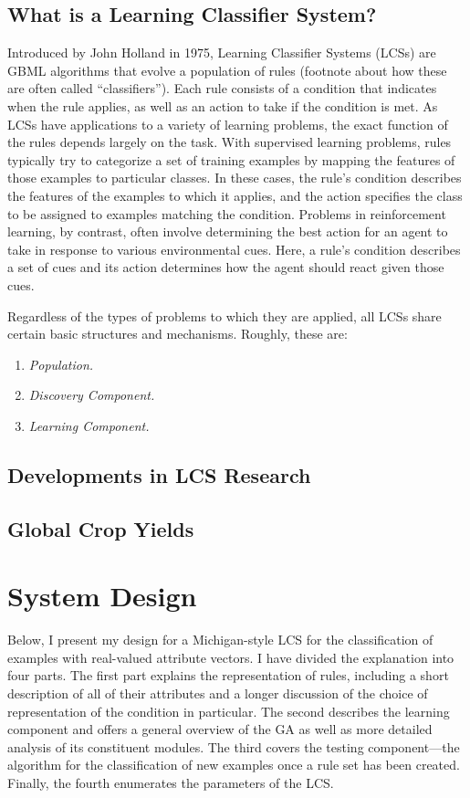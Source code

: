\documentclass[11pt]{article}
\begin{document}
\subsection{What is a Learning Classifier System?}

Introduced by John Holland in 1975, Learning Classifier Systems (LCSs) are GBML algorithms that evolve a population of rules (footnote about how these are often called “classifiers”). Each rule consists of a condition that indicates when the rule applies, as well as an action to take if the condition is met. As LCSs have applications to a variety of learning problems, the exact function of the rules depends largely on the task. With supervised learning problems, rules typically try to categorize a set of training examples by mapping the features of those examples to particular classes. In these cases, the rule’s condition describes the features of the examples to which it applies, and the action specifies the class to be assigned to examples matching the condition. Problems in reinforcement learning, by contrast, often involve determining the best action for an agent to take in response to various environmental cues. Here, a rule’s condition describes a set of cues and its action determines how the agent should react given those cues.

Regardless of the types of problems to which they are applied, all LCSs share certain basic structures and mechanisms. Roughly, these are:

\begin{enumerate}
\item \textit{Population.}
\item \textit{Discovery Component.}
\item \textit{Learning Component.}
\end{enumerate}
\subsection{Developments in LCS Research}
\subsection{Global Crop Yields}
\section{System Design}
Below, I present my design for a Michigan-style LCS for the classification of examples with real-valued attribute vectors. I have divided the explanation into four parts. The first part explains the representation of rules, including a short description of all of their attributes and a longer discussion of the choice of representation of the condition in particular. The second describes the learning component and offers a general overview of the GA as well as more detailed analysis of its constituent modules. The third covers the testing component---the algorithm for the classification of new examples once a rule set has been created. Finally, the fourth enumerates the parameters of the LCS.
\end{document}

